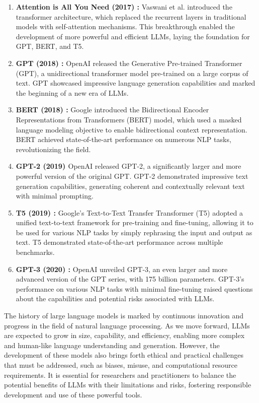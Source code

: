 \begin{enumerate}
    \item \textbf{Attention is All You Need (2017) \cite{vaswani2023attention}:} Vaswani et al. introduced the transformer architecture, which replaced the recurrent layers in traditional models with self-attention mechanisms. This breakthrough enabled the development of more powerful and efficient LLMs, laying the foundation for GPT, BERT, and T5.
    \item \textbf{GPT (2018) \cite{openai:gpt}:} OpenAI released the Generative Pre-trained Transformer (GPT), a unidirectional transformer model pre-trained on a large corpus of text. GPT showcased impressive language generation capabilities and marked the beginning of a new era of LLMs.
    \item \textbf{BERT (2018) \cite{devlin2019bert}:} Google introduced the Bidirectional Encoder Representations from Transformers (BERT) model, which used a masked language modeling objective to enable bidirectional context representation. BERT achieved state-of-the-art performance on numerous NLP tasks, revolutionizing the field.
    \item \textbf{GPT-2 (2019) \cite{radford2019language}} OpenAI released GPT-2, a significantly larger and more powerful version of the original GPT. GPT-2 demonstrated impressive text generation capabilities, generating coherent and contextually relevant text with minimal prompting.
    \item \textbf{T5 (2019) \cite{raffel2023exploring}:} Google's Text-to-Text Transfer Transformer (T5) adopted a unified text-to-text framework for pre-training and fine-tuning, allowing it to be used for various NLP tasks by simply rephrasing the input and output as text. T5 demonstrated state-of-the-art performance across multiple benchmarks.
    \item \textbf{GPT-3 (2020) \cite{brown2020language}:} OpenAI unveiled GPT-3, an even larger and more advanced version of the GPT series, with 175 billion parameters. GPT-3's performance on various NLP tasks with minimal fine-tuning raised questions about the capabilities and potential risks associated with LLMs.
\end{enumerate}

The history of large language models is marked by continuous innovation and progress in the field of natural language processing. As we move forward, LLMs are expected to grow in size, capability, and efficiency, enabling more complex and human-like language understanding and generation. However, the development of these models also brings forth ethical and practical challenges that must be addressed, such as biases, misuse, and computational resource requirements. It is essential for researchers and practitioners to balance the potential benefits of LLMs with their limitations and risks, fostering responsible development and use of these powerful tools.

